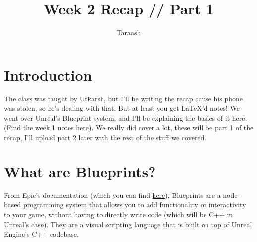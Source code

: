 \documentclass{article}
\title{Week 2 Recap // Part 1}
\author{Taraash}
\date{}
\begin{document}
\newcommand{\img}[1]{
    \begin{figure}[h]
        \centering
        \texttt{[image: day3images/image\#1.png]}
    \end{figure}
}

\newcommand{\imgs}[2]{
    \begin{figure}[h]
        \centering
        \texttt{[image: day3images/image\#1.png]}
    \end{figure}
}

\newcommand{\imgc}[2]{
    \begin{figure}[h]
        \centering
        \texttt{[image: day3images/image\#1.png]}
        \caption{#2}
    \end{figure}
}
\newcommand{\imgcs}[3]{
    \begin{figure}[h]
        \centering
        \texttt{[image: day3images/image\#1.png]}
        \caption{#2}
    \end{figure}
}

\maketitle

{\color{black}\tableofcontents}

\newpage

\section{Introduction}
The class was taught by Utkarsh, but I'll be writing the recap cause his phone was stolen, so he's dealing with that. But at least you get \LaTeX'd notes! We went over Unreal's Blueprint system, and I'll be explaining the basics of it here. (Find the week 1 notes \href{https://drive.google.com/file/d/1lQe5a4SLz2XNIeowUvlHh4XTV2jSIWGw/view?usp=drive_link}{here}). We really did cover a lot, these will be part 1 of the recap, I'll upload part 2 later with the rest of the stuff we covered.

\section{What are Blueprints?}
From Epic's documentation (which you can find \href{https://dev.epicgames.com/documentation/en-us/unreal-engine/introduction-to-blueprints-visual-scripting-in-unreal-engine}{here}), Blueprints are a node-based programming system that allows you to add functionality or interactivity to your game, without having to directly write code (which will be C++ in Unreal's case). They are a visual scripting language that is built on top of Unreal Engine's C++ codebase.
\end{document}
